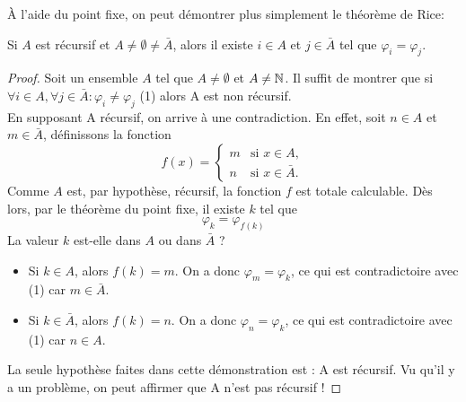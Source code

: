 \begin{myrem}
  À l'aide du point fixe, on peut démontrer plus simplement le théorème de Rice:

\begin{center}
Si $A$ est récursif et $A \neq \emptyset \neq \bar{A}$, alors il existe $i \in A$ et $j \in \bar{A}$ tel que $\varphi_i = \varphi_j$.
\end{center}

  \begin{proof}
    Soit un ensemble $A$ tel que $A \neq \emptyset$ et $A \neq \mathbb{N}$.  Il suffit de montrer que si
    $\forall i \in A, \forall j \in \bar{A} : \varphi_i \neq \varphi_j$  (1) alors A est non récursif. \\
    En supposant A récursif, on arrive à une contradiction.  En effet,
    soit $n \in A$ et $m \in \bar{A}$, définissons la fonction
    \[
      f(x) =
      \begin{cases}
        m & \text{si }x \in A,\\
        n & \text{si }x \in \bar{A}.
      \end{cases}
    \]
    Comme $A$ est, par hypothèse, récursif, la fonction $f$ est totale calculable.
    Dès lors, par le théorème du point fixe, il existe $k$ tel que
    \[ \varphi_k = \varphi_{f(k)} \]
    La valeur $k$ est-elle dans $A$ ou dans $\bar{A}$ ?
    \begin{itemize}
      \item Si $k \in A$, alors $f(k)=m$.  On a donc $\varphi_m = \varphi_k$, ce qui est contradictoire avec (1) car
       $m \in \bar{A}$.
      \item Si $k \in \bar{A}$, alors $f(k)=n$.  On a donc $\varphi_n = \varphi_k$, ce qui est contradictoire avec (1) car
        $n \in A$.
    \end{itemize}
La seule hypothèse faites dans cette démonstration est : A est récursif. Vu qu'il y a un problème, on peut affirmer que A n'est pas récursif ! 
  \end{proof}
\end{myrem}


